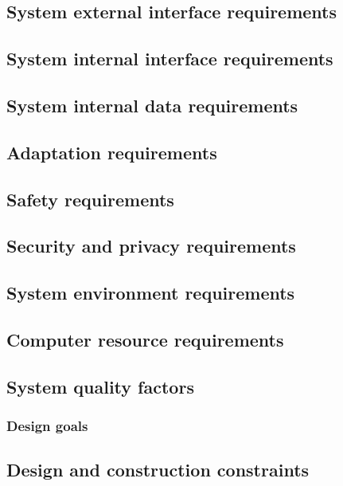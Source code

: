 \documentclass[a4paper, oneside, 11pt]{article}
\begin{document}
\subsection{System external interface requirements}

\subsection{System internal interface requirements}

\subsection{System internal data requirements}

\subsection{Adaptation requirements}

\subsection{Safety requirements}

\subsection{Security and privacy requirements}

\subsection{System environment requirements}

\subsection{Computer resource requirements}

\subsection{System quality factors}
\subsubsection{Design goals}

\subsection{Design and construction constraints}

\end{document}
